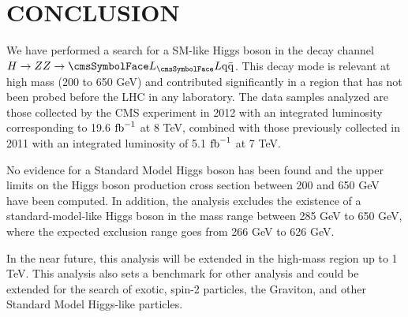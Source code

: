 %
%

\chapter{CONCLUSION}

We have performed a search for a SM-like Higgs boson in the decay channel $H \rightarrow ZZ \rightarrow \LL \qqbar$.  This decay mode is relevant at high mass (200 to 650 GeV) and contributed significantly in a region that has not been probed before the LHC in any laboratory. The data samples analyzed are those collected by the CMS experiment in 2012 with an integrated luminosity corresponding to 19.6 $\mbox{$\textrm{fb}^{-1}$}$ at 8 TeV, combined with those previously collected in 2011 with an integrated luminosity of 5.1 $\mbox{$\textrm{fb}^{-1}$}$ at 7 TeV.

No evidence for a Standard Model Higgs boson has been found and the upper limits on the Higgs boson production cross section between 200 and 650 GeV have been computed.  In addition, the analysis excludes the existence of a standard-model-like Higgs boson in the mass range between 285 GeV to 650 GeV, where the expected exclusion range goes from 266 GeV to 626 GeV.

In the near future, this analysis will be extended in the high-mass region up to 1 TeV.  This analysis also sets a benchmark for other analysis and could be extended for the search of exotic, spin-2 particles, the Graviton, and other Standard Model Higgs-like particles.
